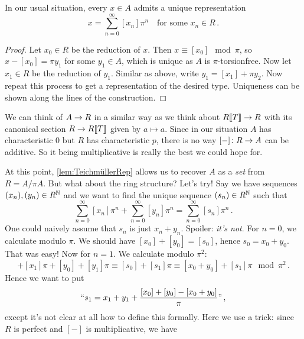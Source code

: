 \begin{lem}\label{lem:TeichmüllerRep}
	In our usual situation, every $x\in A$ admits a unique representation
	\begin{equation*}
		x=\sum_{n=0}^{\infty}[x_n]\pi^n\quad\text{for some }x_n\in R\,.
	\end{equation*}
\end{lem}
\begin{proof}
	Let $x_0\in R$ be the reduction of $x$. Then $x\equiv[x_0]\mod \pi$, so $x-[x_0]=\pi y_1$ for some $y_1\in A$, which is unique as $A$ is $\pi$-torsionfree. Now let $x_1\in R$ be the reduction of $y_1$. Similar as above, write $y_1=[x_1]+\pi y_2$. Now repeat this process to get a representation of the desired type. Uniqueness can be shown along the lines of the construction.
\end{proof}
\begin{urem}
	We can think of $A\morphism R$ in a similar way as we think about $R\llbracket T\rrbracket\morphism R$ with its canonical section $R\morphism R\llbracket T\rrbracket$ given by $a\mapsto a$. Since in our situation $A$ has characteristic $0$ but $R$ has characteristic $p$, there is no way $[-]\colon R\morphism A$ can be additive. So it being multiplicative is really the best we could hope for.
\end{urem}
At this point, \cref{lem:TeichmüllerRep} allows us to recover $A$ as a \emph{set} from $R=A/\pi A$. But what about the ring structure? Let's try! Say we have sequences $(x_n),(y_n)\in R^{\mathbb{N}}$ and we want to find the unique sequence $(s_n)\in R^{\mathbb{N}}$ such that
\begin{equation*}
	\sum_{n=0}^{\infty}[x_n]\pi^n+\sum_{n=0}^{\infty}[y_n]\pi^n=\sum_{n=0}^\infty [s_n]\pi^n\,.
\end{equation*}
One could naively assume that $s_n$ is just $x_n+y_n$. Spoiler: \emph{it's not}. For $n=0$, we calculate modulo $\pi$. We should have $[x_0]+[y_0]=[s_0]$, hence $s_0=x_0+y_0$. That was easy! Now for $n=1$. We calculate modulo $\pi^2$:
\begin{equation*}
	[x_0]+[x_1]\pi+[y_0]+[y_1]\pi\equiv [s_0]+[s_1]\pi\equiv [x_0+y_0]+[s_1]\pi\mod \pi^2\,.
\end{equation*}
Hence we want to put
\begin{equation*}
	``s_1=x_1+y_1+\frac{[x_0]+[y_0]-[x_0+y_0]}{\pi}\text{''}\,,
\end{equation*}
except it's not clear at all how to define this formally. Here we use a trick: since $R$ is perfect and $[-]$ is multiplicative, we have
